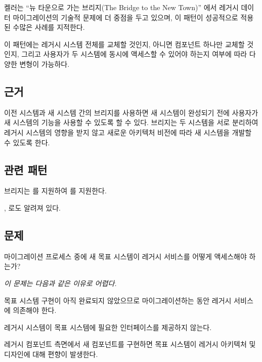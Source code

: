 \documentclass[a4paper,10pt,twoside]{book}
\begin{document}
켈러는 ``뉴 타운으로 가는 브리지(The Bridge to the New Town)'' \cite{Kell00a}에서 레거시 데이터 마이그레이션의 기술적 문제에 더 중점을 두고 있으며, 이 패턴이 성공적으로 적용된 수많은 사례를 지적한다.

이 패턴에는 레거시 시스템 전체를 교체할 것인지, 아니면 컴포넌트 하나만 교체할 것인지, 그리고 사용자가 두 시스템에 동시에 액세스할 수 있어야 하는지 여부에 따라 다양한 변형이 가능하다.

\subsection*{근거}

이전 시스템과 새 시스템 간의 브리지를 사용하면 새 시스템이 완성되기 전에 사용자가 새 시스템의 기능을 사용할 수 있도록 할 수 있다. 브리지는 두 시스템을 서로 분리하여 레거시 시스템의 영향을 받지 않고 새로운 아키텍처 비전에 따라 새 시스템을 개발할 수 있도록 한다.

\subsection*{관련 패턴}

브리지는 를 지원하여 를 지원한다.


 \cite{Ocal00a},  \cite{Foot00a}로도 알려져 있다.


\subsection*{문제}

마이그레이션 프로세스 중에 새 목표 시스템이 레거시 서비스를 어떻게 액세스해야 하는가?

\emph{이 문제는 다음과 같은 이유로 어렵다.}

\begin{bulletlist}
\item 목표 시스템 구현이 아직 완료되지 않았으므로 마이그레이션하는 동안 레거시 서비스에 의존해야 한다. 

\item 레거시 시스템이 목표 시스템에 필요한 인터페이스를 제공하지 않는다.

\item 레거시 컴포넌트 측면에서 새 컴포넌트를 구현하면 목표 시스템이 레거시 아키텍처 및 디자인에 대해 편향이 발생한다.
\end{bulletlist}
\end{document}
